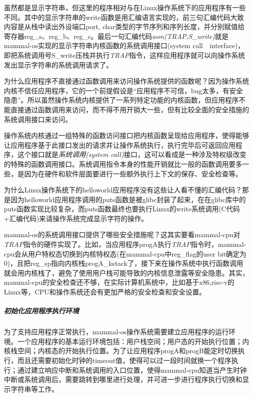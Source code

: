 虽然都是显示字符串，但这里的程序相对与在Linux操作系统下的应用程序有一些不同。其中的显示字符串的write函数是用汇编语言实现的，前三句汇编代码大致内容是从栈中读出外设端口port, char类型的字节序列和序列长度，并分别赋值给寄存器reg\_a、reg\_b、reg\_c。最后一句汇编代码\textit{asm(TRAP,S\_write)}就是mammal-os实现的显示字符串内核函数的系统调用接口(system call　interface)，即把系统调用号S\_write压栈并执行\textit{TRAP}指令，这样应用程序就可以向操作系统发出显示字符串的系统调用请求了。

为什么应用程序不直接通过函数调用来访问操作系统提供的函数呢？因为操作系统内核不信任应用程序，它的一个前提假设是“应用程序不可信，bug太多，有安全隐患”。所以虽然操作系统内核提供了一系列特定功能的内核函数，但应用程序不能直接通过函数调用来访问，而不得不用开销大一些，但有比较全面的安全措施的系统调用接口来访问。

\begin{note} 
操作系统内核通过一组特殊的函数访问接口把内核函数呈现给应用程序，使得能够让应用程序基于此接口发出的请求并让操作系统执行，执行完毕后可返回应用程序，这个接口就是\emph{系统调用(system call)}接口\label{syscall}，这可以看成是一种涉及特权级改变的特殊的函数调用接口。系统调用指令本身的性能开销就比一般的函数调用要多一些，是因为在硬件和软件层面要进行一些额外执行上下文的保存、安全检查等。
\end{note} 

为什么Linux操作系统下的helloworld应用程序没有这些让人看不懂的汇编代码？那是因为helloworld应用程序调用的puts函数是被glibc封装了起来，在在glibc库中的puts函数实现比较复杂，而puts函数最终也要执行Linux的write系统调用(C代码+汇编代码)来请操作系统完成显示字符的操作。

mammal-os的系统调用接口提供了哪些安全措施呢？这其实要看mammal-cpu对\textit{TRAP}指令的硬件实现了。比如，当应用程序progA执行\textit{TRAP}指令时，mammal-cpu会从用户特权态切换到内核特权态(在mammal-cpu中reg\_flag的user bit确定为0)，且把reg\_sp指向内核栈progA\_kstack了，接下来在操作系统中执行函数调用就会用内核栈了，避免了使用用户栈可能导致的内核信息泄露等安全隐患。其实，mammal-cpu的安全检查还不够，在实际计算机系统中，比如基于x86,risc-v的Linux等，CPU和操作系统还会有更加严格的安全检查和安全设置。


\subparagraph{初始化应用程序执行环境}
为了支持应用程序正常执行，mammal-os操作系统需要建立应用程序的运行环境。一个应用程序的基本运行环境包括：用户栈空间；用户态的开始执行位置；内核栈空间；内核态的开始执行位置。为了让应用程序progA和progB能定时切换执行，而且还需要初始化时钟的timeout值，使得可以过一段时间就换一个程序执行；通过建立响应中断和系统调用的入口位置，使得mammal-cpu知道当产生时钟中断或系统调用后，需要跳转到哪里进行处理，并可进一步进行程序执行切换和显示字符串等工作。


